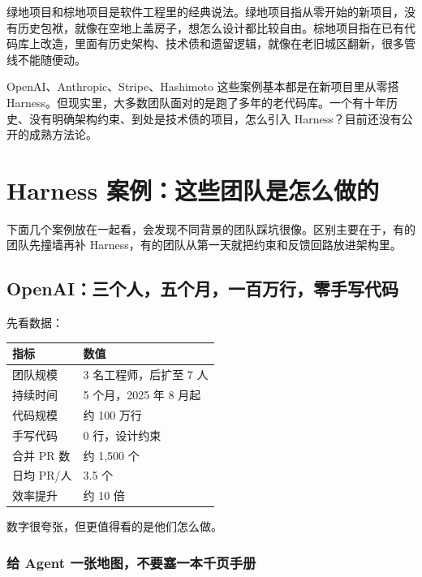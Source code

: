 \documentclass[10pt,a4paper]{ctexart}
\begin{document}
绿地项目和棕地项目是软件工程里的经典说法。绿地项目指从零开始的新项目，没有历史包袱，就像在空地上盖房子，想怎么设计都比较自由。棕地项目指在已有代码库上改造，里面有历史架构、技术债和遗留逻辑，就像在老旧城区翻新，很多管线不能随便动。



OpenAI、Anthropic、Stripe、Hashimoto 这些案例基本都是在新项目里从零搭 Harness。但现实里，大多数团队面对的是跑了多年的老代码库。一个有十年历史、没有明确架构约束、到处是技术债的项目，怎么引入 Harness？目前还没有公开的成熟方法论。



\section{Harness 案例：这些团队是怎么做的}


下面几个案例放在一起看，会发现不同背景的团队踩坑很像。区别主要在于，有的团队先撞墙再补 Harness，有的团队从第一天就把约束和反馈回路放进架构里。



\subsection{OpenAI：三个人，五个月，一百万行，零手写代码}


先看数据：


{\footnotesize
\begin{tabularx}{\textwidth}{|X|X|}
\hline
\textbf{指标} & \textbf{数值} \\
\hline
团队规模 & 3 名工程师，后扩至 7 人 \\
\hline
持续时间 & 5 个月，2025 年 8 月起 \\
\hline
代码规模 & 约 100 万行 \\
\hline
手写代码 & 0 行，设计约束 \\
\hline
合并 PR 数 & 约 1,500 个 \\
\hline
日均 PR/人 & 3.5 个 \\
\hline
效率提升 & 约 10 倍 \\
\hline
\end{tabularx}
}



数字很夸张，但更值得看的是他们怎么做。



\subsubsection{给 Agent 一张地图，不要塞一本千页手册}
\end{document}
